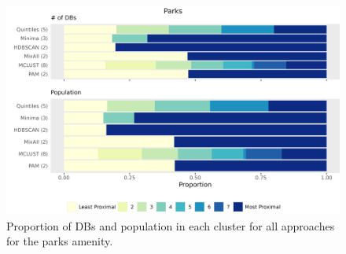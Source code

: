 \documentclass[11pt, a4paper]{article}
\begin{document}
\begin{figure}[H]
\centering
\includegraphics[width=\textwidth]{./barplot_comparison/Parks_barplot.png}
\caption[Parks profile barplot]{Proportion of DBs and population in each cluster for all approaches for the parks amenity.}\label{parksbarplot}
\end{figure}




\centering
\begin{table}[H]
\centering
\caption[Parks validation metrics]{The validation metric values for each clustering approach for the parks amenity.}\label{parksvalid}
\end{table}
\end{document}
